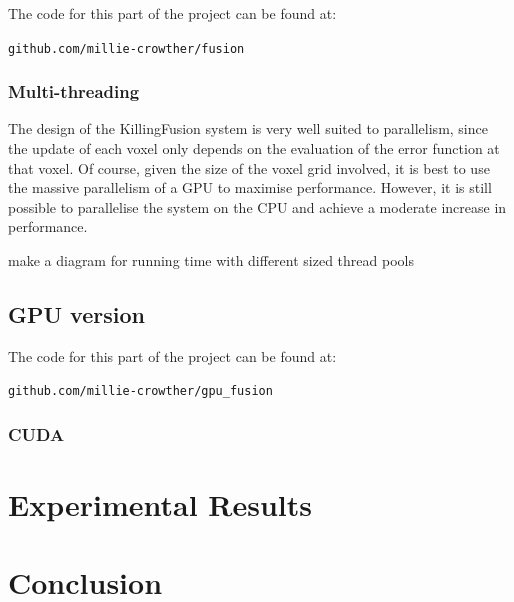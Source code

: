 \documentclass[12pt,twoside]{report}
\begin{document}
The code for this part of the project can be found at:

\begin{center}
\verb|github.com/millie-crowther/fusion|
\end{center}

\subsection{Multi-threading}

The design of the KillingFusion system is very well suited to parallelism, since the update of each voxel only depends on the evaluation of the error function at that voxel. 
Of course, given the size of the voxel grid involved, it is best to use the massive parallelism of a GPU to maximise performance.
However, it is still possible to parallelise the system on the CPU and achieve a moderate increase in performance. 

make a diagram for running time with different sized thread pools

\section{GPU version}

The code for this part of the project can be found at:

\begin{center}
\verb|github.com/millie-crowther/gpu_fusion|
\end{center}

\subsection{CUDA}

\chapter{Experimental Results}


\chapter{Conclusion}



\end{document}
